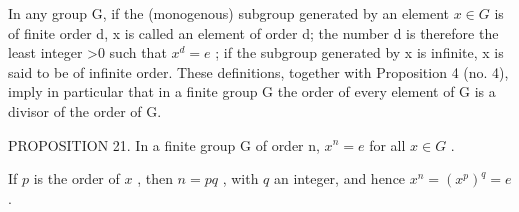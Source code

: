 In any group G, if the (monogenous) subgroup generated by an element \(x \in G\) is of finite order d, x is called an element of order d; the number d is therefore the least integer \textgreater0 such that \(x^{d} = e\) ; if the subgroup generated by x is infinite, x is said to be of infinite order. These definitions, together with Proposition 4 (no. 4), imply in particular that in a finite group G the order of every element of G is a divisor of the order of G.

PROPOSITION 21. In a finite group G of order n, \(x^{n} = e\) for all \(x \in G\) .

If \(p\) is the order of \(x\) , then \(n = pq\) , with \(q\) an integer, and hence \(x^n = (x^p)^q = e\) .

